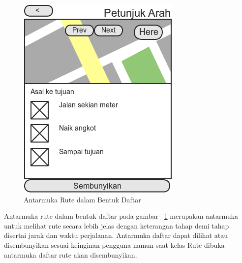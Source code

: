 \begin{figure}[h]
	\centering
		\includegraphics[scale=0.6]{Gambar/perancangan_antarmuka/ListRoute}
	\caption{Antarmuka Rute dalam Bentuk Daftar}
	\label{fig:Antarmuka listRoute}
\end{figure}

\hspace{0.5cm} Antarmuka rute dalam bentuk daftar pada gambar ~\ref{fig:Antarmuka listRoute} merupakan antarmuka untuk melihat rute secara lebih jelas dengan keterangan tahap demi tahap disertai jarak dan waktu perjalanan. Antarmuka daftar dapat dilihat atau disembunyikan sesuai keinginan pengguna namun saat kelas Rute dibuka antarmuka daftar rute akan disembunyikan.
